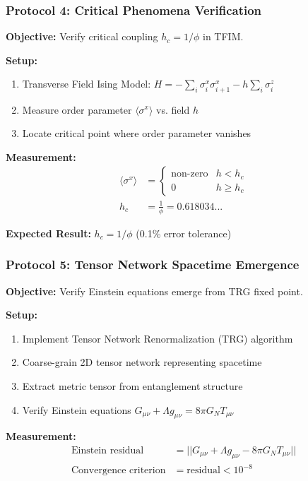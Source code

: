 \documentclass[11pt]{article}
\theoremstyle{definition}
\newcommand{\goldenratio}{\phi}
\begin{document}
\subsubsection{Protocol 4: Critical Phenomena Verification}

\textbf{Objective:} Verify critical coupling $h_c = 1/\goldenratio$ in TFIM.

\textbf{Setup:}
\begin{enumerate}
\item Transverse Field Ising Model: $H = -\sum_i \sigma_i^x \sigma_{i+1}^x - h \sum_i \sigma_i^z$
\item Measure order parameter $\langle \sigma^x \rangle$ vs. field $h$
\item Locate critical point where order parameter vanishes
\end{enumerate}

\textbf{Measurement:}
\begin{align}
\langle \sigma^x \rangle &= \begin{cases}
\text{non-zero} & h < h_c \\
0 & h \geq h_c
\end{cases} \\
h_c &= \frac{1}{\goldenratio} = 0.618034...
\end{align}

\textbf{Expected Result:} $h_c = 1/\goldenratio$ (0.1\% error tolerance)

\subsubsection{Protocol 5: Tensor Network Spacetime Emergence}

\textbf{Objective:} Verify Einstein equations emerge from TRG fixed point.

\textbf{Setup:}
\begin{enumerate}
\item Implement Tensor Network Renormalization (TRG) algorithm
\item Coarse-grain 2D tensor network representing spacetime
\item Extract metric tensor from entanglement structure
\item Verify Einstein equations $G_{\mu\nu} + \Lambda g_{\mu\nu} = 8\pi G_N T_{\mu\nu}$
\end{enumerate}

\textbf{Measurement:}
\begin{align}
\text{Einstein residual} &= ||G_{\mu\nu} + \Lambda g_{\mu\nu} - 8\pi G_N T_{\mu\nu}|| \\
\text{Convergence criterion} &= \text{residual} < 10^{-8}
\end{align}
\end{document}
